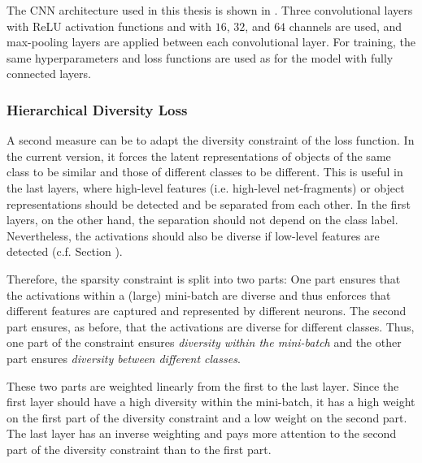 The CNN architecture used in this thesis is shown in .
Three convolutional layers with ReLU activation functions and with $16$, $32$, and $64$ channels are used, and max-pooling layers are applied between each convolutional layer. For training, the same hyperparameters and loss functions are used as for the model with fully connected layers.























\subsubsection{Hierarchical Diversity Loss}
A second measure can be to adapt the diversity constraint of the loss function. In the current version, it forces the latent representations of objects of the same class to be similar and those of different classes to be different. This is useful in the last layers, where high-level features (i.e. high-level net-fragments) or object representations should be detected and be separated from each other. In the first layers, on the other hand, the separation should not depend on the class label. Nevertheless, the activations should also be diverse if low-level features are detected (c.f. Section ).

Therefore, the sparsity constraint is split into two parts: One part ensures that the activations within a (large) mini-batch are diverse and thus enforces that different features are captured and represented by different neurons. The second part ensures, as before, that the activations are diverse for different classes. Thus, one part of the constraint ensures \emph{diversity within the mini-batch} and the other part ensures \emph{diversity between different classes}.

These two parts are weighted linearly from the first to the last layer. Since the first layer should have a high diversity within the mini-batch, it has a high weight on the first part of the diversity constraint and a low weight on the second part. The last layer has an inverse weighting and pays more attention to the second part of the diversity constraint than to the first part.

